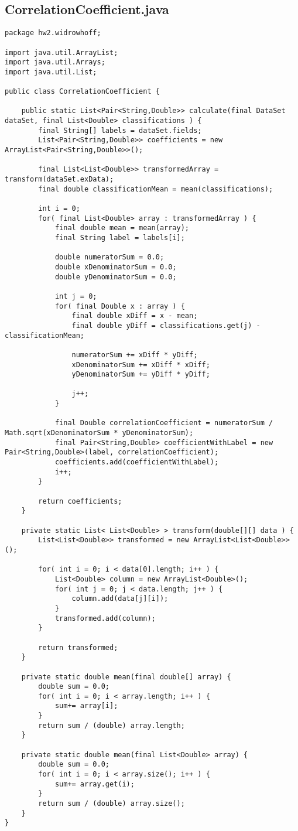 \subsection{CorrelationCoefficient.java}
\begin{lstlisting}
package hw2.widrowhoff;

import java.util.ArrayList;
import java.util.Arrays;
import java.util.List;

public class CorrelationCoefficient {

	public static List<Pair<String,Double>> calculate(final DataSet dataSet, final List<Double> classifications ) {
		final String[] labels = dataSet.fields;
		List<Pair<String,Double>> coefficients = new ArrayList<Pair<String,Double>>();
		
		final List<List<Double>> transformedArray = transform(dataSet.exData);
		final double classificationMean = mean(classifications);
		
		int i = 0;
		for( final List<Double> array : transformedArray ) {
			final double mean = mean(array);
			final String label = labels[i];
			
			double numeratorSum = 0.0;
			double xDenominatorSum = 0.0;
			double yDenominatorSum = 0.0;
			
			int j = 0;
			for( final Double x : array ) {
				final double xDiff = x - mean;
				final double yDiff = classifications.get(j) - classificationMean;
				
				numeratorSum += xDiff * yDiff;
				xDenominatorSum += xDiff * xDiff;
				yDenominatorSum += yDiff * yDiff;
				
				j++;
			}
			
			final Double correlationCoefficient = numeratorSum / Math.sqrt(xDenominatorSum * yDenominatorSum);
			final Pair<String,Double> coefficientWithLabel = new Pair<String,Double>(label, correlationCoefficient);
			coefficients.add(coefficientWithLabel);
			i++;
		}
		
		return coefficients;
	}
	
	private static List< List<Double> > transform(double[][] data ) {
		List<List<Double>> transformed = new ArrayList<List<Double>>();
		
		for( int i = 0; i < data[0].length; i++ ) {
			List<Double> column = new ArrayList<Double>();
			for( int j = 0; j < data.length; j++ ) {
				column.add(data[j][i]);
			}
			transformed.add(column);
		}
		
		return transformed;
	}
	
	private static double mean(final double[] array) {
		double sum = 0.0;
		for( int i = 0; i < array.length; i++ ) {
			sum+= array[i];
		}
		return sum / (double) array.length;
	}
	
	private static double mean(final List<Double> array) {
		double sum = 0.0;
		for( int i = 0; i < array.size(); i++ ) {
			sum+= array.get(i);
		}
		return sum / (double) array.size();
	}
}
\end{lstlisting}
